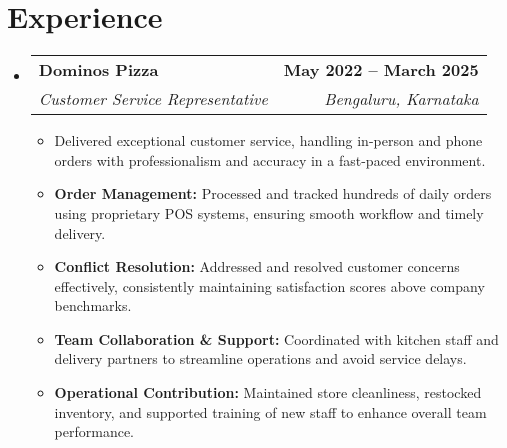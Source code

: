 \documentclass[a4paper,11pt]{article}
\makeatletter
\newcommand{\resumeItem}[1]{
	\item\small{#1 \vspace{-2pt}}
}
\newcommand{\resumeSubheading}[4]{
	\vspace{-2pt}\item
		\begin{tabular*}{0.97\textwidth}[t]{l@{\extracolsep{\fill}}r}
			\textbf{#1} & \textbf{\small #2} \\
			\textit{\small#3} & \textit{\small #4} \\
		\end{tabular*}\vspace{-7pt}
}
\newcommand{\resumeSubHeadingListStart}{\begin{itemize}[leftmargin=0.15in, label={}]}
\newcommand{\resumeSubHeadingListEnd}{\end{itemize}}
\newcommand{\resumeItemListStart}{\begin{itemize}}
\newcommand{\resumeItemListEnd}{\end{itemize}\vspace{-5pt}}
\makeatother
\begin{document}
\section{Experience}
\resumeSubHeadingListStart
\resumeSubheading
{Dominos Pizza}{May 2022 -- March 2025}
{Customer Service Representative}{Bengaluru, Karnataka}
\resumeItemListStart
\resumeItem{Delivered exceptional customer service, handling in-person and phone orders with professionalism and accuracy in a fast-paced environment.}
\resumeItem{\textbf{Order Management:} Processed and tracked hundreds of daily orders using proprietary POS systems, ensuring smooth workflow and timely delivery.}
\resumeItem{\textbf{Conflict Resolution:} Addressed and resolved customer concerns effectively, consistently maintaining satisfaction scores above company benchmarks.}
\resumeItem{\textbf{Team Collaboration \& Support:} Coordinated with kitchen staff and delivery partners to streamline operations and avoid service delays.}
\resumeItem{\textbf{Operational Contribution:} Maintained store cleanliness, restocked inventory, and supported training of new staff to enhance overall team performance.}
\resumeItemListEnd
\resumeSubHeadingListEnd
\end{document}
